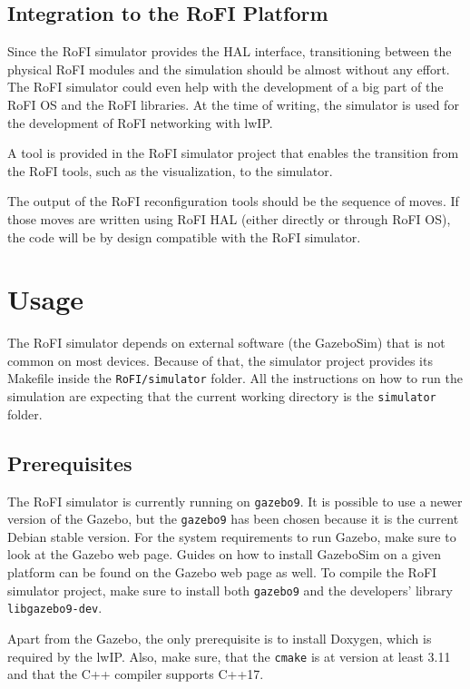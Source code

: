 \documentclass[
  printed, %
  color,   %
  notable, %
  oneside, %
  nolof,   %
  nolot,   %
  nocover,
]{fithesis3}
\newcommand{\code}[1]{\texttt{#1}}
\begin{document}
\section{Integration to the RoFI Platform}

Since the RoFI simulator provides the HAL interface, transitioning between the physical RoFI modules and the simulation should be almost without any effort.
The RoFI simulator could even help with the development of a big part of the RoFI OS and the RoFI libraries.
At the time of writing, the simulator is used for the development of RoFI networking with lwIP.

A tool is provided in the RoFI simulator project that enables the transition from the RoFI tools, such as the visualization, to the simulator.

The output of the RoFI reconfiguration tools should be the sequence of moves.
If those moves are written using RoFI HAL (either directly or through RoFI OS), the code will be by design compatible with the RoFI simulator.


\chapter{Usage}

The RoFI simulator depends on external software (the GazeboSim) that is not common on most devices.
Because of that, the simulator project provides its Makefile inside the \code{RoFI/simulator} folder.
All the instructions on how to run the simulation are expecting that the current working directory is the \code{simulator} folder.

\section{Prerequisites}

The RoFI simulator is currently running on \code{gazebo9}.
It is possible to use a newer version of the Gazebo, but the \code{gazebo9} has been chosen because it is the current Debian stable version.
For the system requirements to run Gazebo, make sure to look at the Gazebo web page\cite{gazebo}.
Guides on how to install GazeboSim on a given platform can be found on the Gazebo web page\cite{gazebo} as well.
To compile the RoFI simulator project, make sure to install both \code{gazebo9} and the developers' library \code{libgazebo9-dev}.

Apart from the Gazebo, the only prerequisite is to install Doxygen, which is required by the lwIP.
Also, make sure, that the \code{cmake} is at version at least 3.11 and that the C++ compiler supports C++17.
\end{document}
